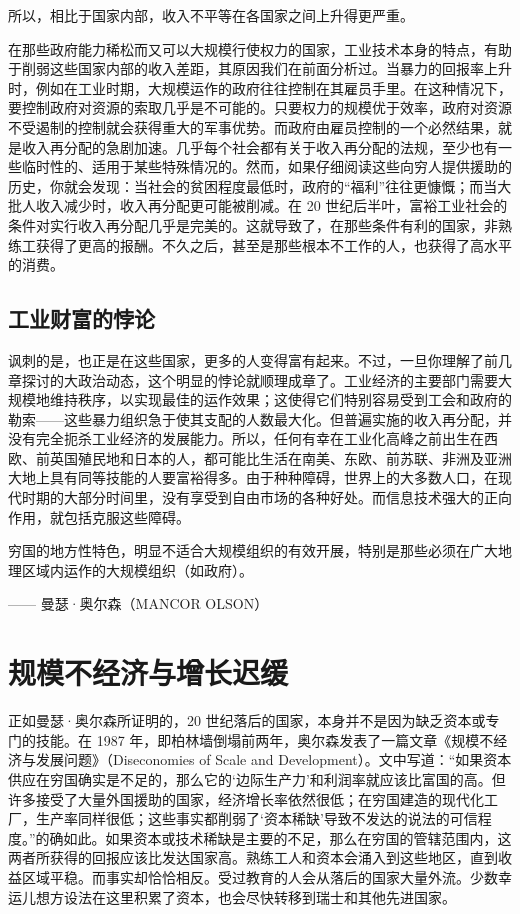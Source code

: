 所以，相比于国家内部，收入不平等在各国家之间上升得更严重。

在那些政府能力稀松而又可以大规模行使权力的国家，工业技术本身的特点，有助于削弱这些国家内部的收入差距，其原因我们在前面分析过。当暴力的回报率上升时，例如在工业时期，大规模运作的政府往往控制在其雇员手里。在这种情况下，要控制政府对资源的索取几乎是不可能的。只要权力的规模优于效率，政府对资源不受遏制的控制就会获得重大的军事优势。而政府由雇员控制的一个必然结果，就是收入再分配的急剧加速。几乎每个社会都有关于收入再分配的法规，至少也有一些临时性的、适用于某些特殊情况的。然而，如果仔细阅读这些向穷人提供援助的历史，你就会发现：当社会的贫困程度最低时，政府的“福利”往往更慷慨；而当大批人收入减少时，收入再分配更可能被削减。在 20 世纪后半叶，富裕工业社会的条件对实行收入再分配几乎是完美的。这就导致了，在那些条件有利的国家，非熟练工获得了更高的报酬。不久之后，甚至是那些根本不工作的人，也获得了高水平的消费。

\subsection{工业财富的悖论}

讽刺的是，也正是在这些国家，更多的人变得富有起来。不过，一旦你理解了前几章探讨的大政治动态，这个明显的悖论就顺理成章了。工业经济的主要部门需要大规模地维持秩序，以实现最佳的运作效果；这使得它们特别容易受到工会和政府的勒索——这些暴力组织急于使其支配的人数最大化。但普遍实施的收入再分配，并没有完全扼杀工业经济的发展能力。所以，任何有幸在工业化高峰之前出生在西欧、前英国殖民地和日本的人，都可能比生活在南美、东欧、前苏联、非洲及亚洲大地上具有同等技能的人要富裕得多。由于种种障碍，世界上的大多数人口，在现代时期的大部分时间里，没有享受到自由市场的各种好处。而信息技术强大的正向作用，就包括克服这些障碍。


\begin{tcolorbox}
穷国的地方性特色，明显不适合大规模组织的有效开展，特别是那些必须在广大地理区域内运作的大规模组织（如政府）。
\begin{flushright}
—— 曼瑟·奥尔森（MANCOR OLSON）  
\end{flushright}
\end{tcolorbox}

\section{规模不经济与增长迟缓}
正如曼瑟·奥尔森所证明的，20 世纪落后的国家，本身并不是因为缺乏资本或专门的技能。在 1987 年，即柏林墙倒塌前两年，奥尔森发表了一篇文章《规模不经济与发展问题》（Diseconomies of Scale and Development）。文中写道：“如果资本供应在穷国确实是不足的，那么它的‘边际生产力’和利润率就应该比富国的高。但许多接受了大量外国援助的国家，经济增长率依然很低；在穷国建造的现代化工厂，生产率同样很低；这些事实都削弱了‘资本稀缺’导致不发达的说法的可信程度。”的确如此。如果资本或技术稀缺是主要的不足，那么在穷国的管辖范围内，这两者所获得的回报应该比发达国家高。熟练工人和资本会涌入到这些地区，直到收益区域平稳。而事实却恰恰相反。受过教育的人会从落后的国家大量外流。少数幸运儿想方设法在这里积累了资本，也会尽快转移到瑞士和其他先进国家。

